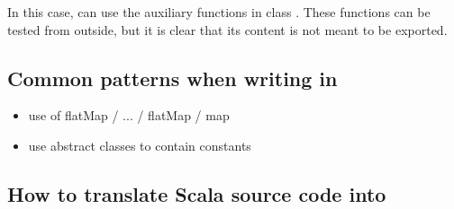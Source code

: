 In this case,  can use the auxiliary functions in class .
These functions can be tested from outside, but it is clear that its content is not meant to be exported.

\subsection{Common patterns when writing in \Soda}
\begin{itemize}
    \item use of flatMap / ... / flatMap / map
    \item use abstract classes to contain constants
\end{itemize}

\subsection{How to translate Scala source code into \Soda}

